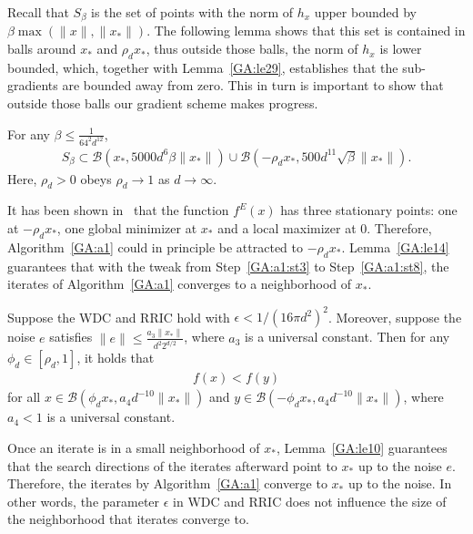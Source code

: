 Recall that $S_\beta$ is the set of points with the norm of $h_x$ upper bounded by $\beta \max(\|x\|, \|x_*\|)$.
The following lemma shows that this set is contained in balls around $x_*$ and $\rho_d x_*$, thus outside those balls, the norm of $h_x$ is lower bounded, which, together with Lemma~\ref{GA:le29}, establishes that the sub-gradients are bounded away from zero. This in turn is important to show that outside those balls our gradient scheme makes progress.
\begin{lemma}{\cite[Lemma~8]{HHHV2018}} \label{lemma:Sepsst}
For any $\beta \leq \frac{1}{64^2 d^{12}}$,
\begin{align*}
S_\beta
\subset
\mathcal{B}(x_*, 5000 d^6 \beta \|x_*\|  ) \cup  \mathcal{B}( - \rho_d x_*, 500 d^{11} \sqrt{\beta} \|x_*\|).
\end{align*}
Here, $\rho_d>0$ obeys $\rho_d \to 1$ as $d \to \infty$.
\end{lemma}

It has been shown in~\cite{HV17} that the function ${f^E}(x)$ has three stationary points: one at $- \rho_d x_*$, one global minimizer at $x_*$ and a local maximizer at $0$. Therefore, Algorithm~\ref{GA:a1} could in principle be attracted to $- \rho_d x_*$. Lemma~\ref{GA:le14} guarantees that with the tweak from Step~\ref{GA:a1:st3} to Step~\ref{GA:a1:st8}, the iterates of Algorithm~\ref{GA:a1} converges to a neighborhood of $x_*$.
\begin{lemma} \label{GA:le14}
Suppose the WDC and RRIC
hold with $\epsilon < 1 / (16 \pi d^2)^2$. Moreover, suppose the noise $e$ satisfies $\|e\| \leq \frac{a_3 \|x_*\|}{d^2 2^{d/2}}$, where $a_3$ is a universal constant. Then for any $\phi_d \in [\rho_d, 1]$, it holds that
\begin{align} \label{GA:e25}
f(x) < f(y)
\end{align}
for all $x \in \mathcal{B}(\phi_d x_*, a_4 d^{-10} \|x_*\|)$ and $y \in \mathcal{B}(- \phi_d x_*, a_4 d^{-10} \|x_*\|)$, where $a_4 < 1$ is a universal constant.
\end{lemma}

Once an iterate is in a small neighborhood of $x_*$, Lemma~\ref{GA:le10} guarantees that the search directions of the iterates afterward point to $x_*$ up to the noise $e$. Therefore, the iterates by Algorithm~\ref{GA:a1} converge to $x_*$ up to the noise. In other words, the parameter $\epsilon$ in WDC and RRIC does not influence the size of the neighborhood that iterates converge to.

